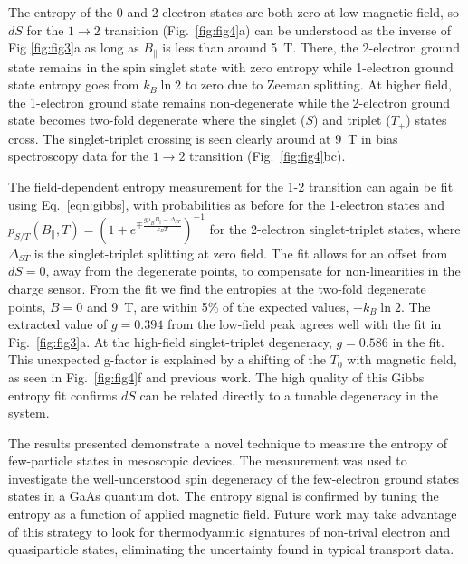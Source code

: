 \documentclass[preprint,showpacs,preprintnumbers,amsmath,amssymb,pra,aps,superscriptaddress]{revtex4-1}
\begin{document}
The entropy of the 0 and 2-electron states are both zero at low magnetic field, so $dS$ for the $1\rightarrow 2$ transition (Fig.~\ref{fig:fig4}a) can be understood as the inverse of Fig \ref{fig:fig3}a as long as $B_\parallel$ is less than around \SI{5}{\tesla}.  There, the 2-electron ground state remains in the spin singlet state with zero entropy while 1-electron ground state entropy goes from $k_B\ln{2}$ to zero due to Zeeman splitting. At higher field, the 1-electron ground state remains non-degenerate while the 2-electron ground state becomes two-fold degenerate where the singlet ($S$) and triplet ($T_+$) states cross. The singlet-triplet crossing is seen clearly around at \SI{9}{\tesla} in bias spectroscopy data for the $1\rightarrow 2$ transition (Fig.~\ref{fig:fig4}bc). 

The field-dependent entropy measurement for the 1-2 transition can again be fit using Eq.~\ref{eqn:gibbs}, with probabilities as before for the 1-electron states and $p_{S/T}(B_\parallel, T) = (1+ e^{\mp \frac{g\mu_B B_\parallel - \Delta_{ST}}{k_B T}})^{-1}$ for the 2-electron singlet-triplet states, where $\Delta_{ST}$ is the singlet-triplet splitting at zero field. The fit allows for an offset from $dS=0$, away from the degenerate points, to compensate for non-linearities in the charge sensor. From the fit we find the entropies at the two-fold degenerate points, $B=0$ and \SI{9}{\tesla}, are within 5\% of the expected values, $\mp k_B \ln{2}$. The extracted value of $g = 0.394$ from the low-field peak agrees well with the fit in Fig.~\ref{fig:fig3}a. At the high-field singlet-triplet degeneracy, $g = 0.586$ in the fit. This unexpected g-factor is explained by a shifting of the $T_{0}$ with magnetic field, as seen in Fig.~\ref{fig:fig4}f and previous work. The high quality of this Gibbs entropy fit confirms $dS$ can be related directly to a tunable degeneracy in the system.

The results presented demonstrate a novel technique to measure the entropy of few-particle states in mesoscopic devices. The measurement was used to investigate the well-understood spin degeneracy of the few-electron ground states states in a GaAs quantum dot. The entropy signal is confirmed by tuning the entropy as a function of applied magnetic field. Future work may take advantage of this strategy to look for thermodyanmic signatures of non-trival electron and quasiparticle states, eliminating the uncertainty found in typical transport data.
\end{document}
